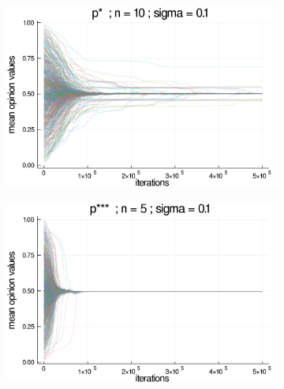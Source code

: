 \documentclass{article}
\begin{document}
\begin{figure}[H]
\begin{subfigure}[b]{0.48\textwidth}
        \includegraphics[width=\textwidth]{img/series/tseries4/Poodlcalculatep*n10-rho10e-5-sigma01-00intransrandom.png}
      \end{subfigure}
      \begin{subfigure}[b]{0.48\textwidth}
        \includegraphics[width=\textwidth]{img/series/tseries4/Poodlcalculatep***n5-rho10e-5-sigma01-00intransrandom.png}
      \end{subfigure}

\end{figure}
\end{document}
